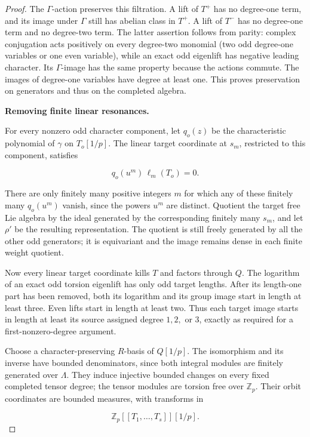 \begin{proof}
The \(\Gamma\)-action preserves this filtration. A lift of \(T^+\) has no degree-one term, and its image under \(\Gamma\) still has abelian class in \(T^+\). A lift of \(T^-\) has no degree-one term and no degree-two term. The latter assertion follows from parity: complex conjugation acts positively on every degree-two monomial (two odd degree-one variables or one even variable), while an exact odd eigenlift has negative leading character. Its \(\Gamma\)-image has the same property because the actions commute. The images of degree-one variables have degree at least one. This proves preservation on generators and thus on the completed algebra.

\par\medskip\noindent\textbf{Removing finite linear resonances.}

For every nonzero odd character component, let \(q_o(z)\) be the characteristic polynomial of \(\gamma\) on \(T_o[1/p]\). The linear target coordinate at \(s_m\), restricted to this component, satisfies

\[
q_o(u^m)\,\ell_m(T_o)=0.
\]

There are only finitely many positive integers \(m\) for which any of these finitely many \(q_o(u^m)\) vanish, since the powers \(u^m\) are distinct. Quotient the target free Lie algebra by the ideal generated by the corresponding finitely many \(s_m\), and let \(\rho'\) be the resulting representation. The quotient is still freely generated by all the other odd generators; it is equivariant and the image remains dense in each finite weight quotient.

Now every linear target coordinate kills \(T\) and factors through \(Q\). The logarithm of an exact odd torsion eigenlift has only odd target lengths. After its length-one part has been removed, both its logarithm and its group image start in length at least three. Even lifts start in length at least two. Thus each target image starts in length at least its source assigned degree \(1,2,\) or \(3\), exactly as required for a first-nonzero-degree argument.

Choose a character-preserving \(R\)-basis of \(Q[1/p]\). The isomorphism and its inverse have bounded denominators, since both integral modules are finitely generated over \(\Lambda\). They induce injective bounded changes on every fixed completed tensor degree; the tensor modules are torsion free over \(\mathbb Z_p\). Their orbit coordinates are bounded measures, with transforms in

\[
\mathbb Z_p[[T_1,\ldots,T_s]][1/p].
\]


\end{proof}
